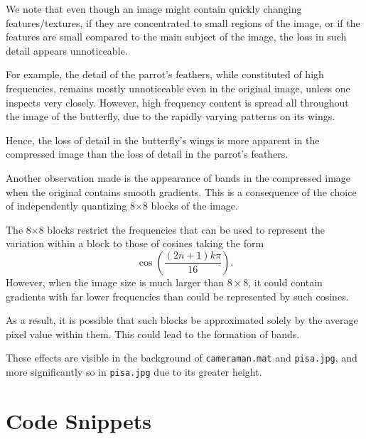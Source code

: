 \documentclass{article}[a4paper]
\begin{document}
	We note that even though an image might contain quickly changing features/textures, if they are concentrated to small regions of the image, or if the features are small compared to the main subject of the image, the loss in such detail appears unnoticeable.
	
	For example, the detail of the parrot's feathers, while constituted of high frequencies, remains mostly unnoticeable even in the original image, unless one inspects very closely. However, high frequency content is spread all throughout the image of the butterfly, due to the rapidly varying patterns on its wings.
	
	Hence, the loss of detail in the butterfly's wings is more apparent in the compressed image than the loss of detail in the parrot's feathers.
	
	Another observation made is the appearance of bands in the compressed image when the original contains smooth gradients. This is a consequence of the choice of independently quantizing 8$\times$8 blocks of the image.
	
	The 8$\times$8 blocks restrict the frequencies that can be used to represent the variation within a block to those of cosines taking the form \[\cos\left(\dfrac{(2n+1)k\pi}{16}\right).\] However, when the image size is much larger than $8\times8$, it could contain gradients with far lower frequencies than could be represented by such cosines.
	
	As a result, it is possible that such blocks be approximated solely by the average pixel value within them. This could lead to the formation of bands.
	
	These effects are visible in the background of \texttt{cameraman.mat} and \texttt{pisa.jpg}, and more significantly so in \texttt{pisa.jpg} due to its greater height.
	
	\appendix
	\section{Code Snippets}
	\label{code}
	
\end{document}
